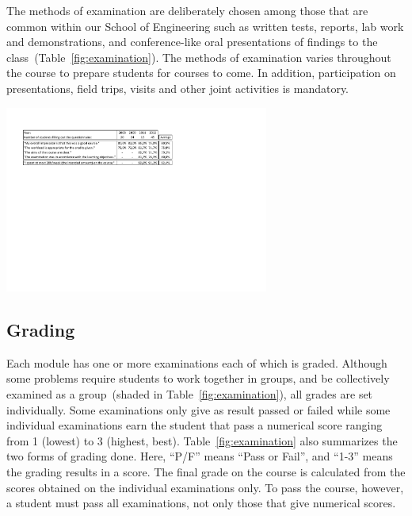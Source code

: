 \documentclass[conference]{IEEEtran}
\begin{document}
The methods of examination are deliberately chosen among those that are common within our School of Engineering such as written tests, reports, lab work and demonstrations, and conference-like oral presentations of findings to the class~(Table~\ref{fig:examination}). 
The methods of examination varies throughout the course to prepare students for courses to come. In addition, participation on presentations, field trips, visits and other joint activities is mandatory. 

\begin{table}[!t]
  \centering
  \includegraphics[width=0.65\textwidth]{course-eval}
  \caption[Statistics from questionnaires.]{Statistics from questionnaires\footnote{}.}
  \label{fig:course-eval}
\end{table}

\subsection{Grading}

Each module has one or more examinations each of which is graded. Although some problems require students to work together in groups, and be collectively examined as a group~(shaded in Table~\ref{fig:examination}), all grades are set individually. Some examinations only give as result passed or failed while some individual examinations earn the student that pass a numerical score ranging from 1 (lowest) to 3 (highest, best). Table~\ref{fig:examination} also summarizes the two forms of grading done. Here, ``P/F'' means ``Pass or Fail'', and ``1-3'' means the grading results in a score. The final grade on the course is calculated from the scores obtained on the individual examinations only. To pass the course, however, a student must pass all examinations, not only those that give numerical scores. 

\end{document}
